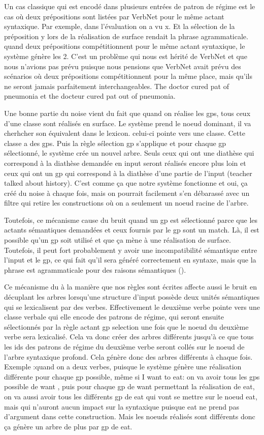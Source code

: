 Un cas classique qui est encodé dans plusieurs entrées de patron de régime est le cas où deux prépositions sont listées par VerbNet pour le même actant syntaxique. Par exemple, dans l'évaluation on a vu x. Et la sélection de la préposition y lors de la réalisation de surface rendait la phrase agrammaticale. quand deux prépositions compétitionnent pour le même actant syntaxique, le système génère les 2. C'est un problème qui nous est hérité de VerbNet et que nous n'avions pas prévu puisque nous pensions que VerbNet avait prévu des scénarios où deux prépositions compétitionnent pour la même place, mais qu'ils ne seront jamais parfaitement interchangeables. The doctor cured pat of pneumonia et the docteur cured pat out of pneumonia.

Une bonne partie du noise vient du fait que quand on réalise les gps, tous ceux d'une classe sont réalisés en surface. Le système prend le noeud dominant, il va cherhcher son équivalent dans le lexicon. celui-ci pointe vers une classe. Cette classe a des gps. Puis la règle sélection gp s'applique et pour chaque gp sélectionné, le système crée un nouvel arbre. Seuls ceux qui ont une diathèse qui correspond à la diathèse demandée en input seront réalisés encore plus loin et ceux qui ont un gp qui correspond à la diathèse d'une partie de l'input (teacher talked about history). C'est comme ça que notre système fonctionne et oui, ça créé du noise à chaque fois, mais on pourrait facilement s'en débarassé avec un filtre qui retire les constructions où on a seulement un noeud racine de l'arbre.

Toutefois, ce mécanisme cause du bruit quand un gp est sélectionné parce que les actants sémantiques demandées et ceux fournis par le gp sont un match. Là, il est possible qu'un gp soit utilisé et que ça mène à une réalisation de surface. Toutefois, il peut fort probablement y avoir une incompatibilité sémantique entre l'input et le gp, ce qui fait qu'il sera généré correctement en syntaxe, mais que la phrase est agrammaticale pour des raisons sémantiques ().

Ce mécanisme du à la manière que nos règles sont écrites affecte aussi le bruit en décuplant les arbres lorsqu'une structure d'input possède deux unités sémantiques qui se lexicalisent par des verbes. Effectivement le deuxième verbe pointe vers une classe verbale qui elle encode des patrons de régime, qui seront ensuite sélectionnés par la règle actant gp selection une fois que le noeud du deuxième verbe sera lexicalisé. Cela va donc créer des arbres différents jusqu'à ce que tous les ids des patrons de régime du deuxième verbe seront collés sur le noeud de l'arbre syntaxique profond. Cela génère donc des arbres différents à chaque fois. Exemple :quand on a deux verbes, puisque le système génère une réalisation différente pour chaque gp possible, même si I want to eat: on va avoir tous les gps possible de want , puis pour chaque gp de want permettant la réalisation de eat, on va aussi avoir tous les différents gp de eat qui vont se mettre sur le noeud eat, mais qui n'auront aucun impact sur la syntaxique puisque eat ne prend pas d'argument dans cette construction. Mais les noeuds réalisés sont différents donc ça génère un arbre de plus par gp de eat.

